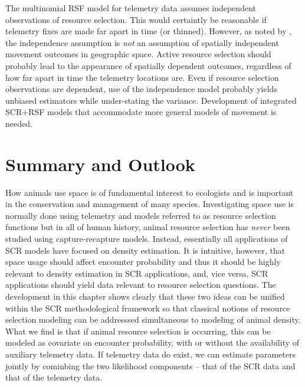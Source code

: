 The multinomial RSF model for telemetry data assumes independent
observations of resource selection.  This would certaintly be
reasonable if telemetry fixes are made far apart in time (or thinned).
However, as noted by \citet{royle_etal:2012mee}, the independence
assumption is {\it not} an assumption of spatially independent
movement outcomes in geographic space.  Active resource selection
should probably lead to the appearance of spatially dependent
outcomes, regardless of how far apart in time the telemetry locations
are.  Even if resource selection observations are dependent, use of
the independence model probably yields unbiased estimators while
under-stating the variance.  Development of integrated SCR+RSF models
that accommodate more general models of movement is needed.




\section{Summary and Outlook}


How animals use space is of fundamental interest to ecologists and is
important in the conservation and management of many
species. Investigating space use is normally done using telemetry and
models referred to as resource selection functions
\citep{manly_etal:2002} but in all of human %
history, animal resource selection has {\it never} been studied using
capture-recapture models. Instead, essentially all applications of SCR
models have focused on density estimation.  It is intuitive, however,
that space usage should affect encounter probability and thus it
should be highly relevant to density estimation in SCR applications,
and, vice versa, SCR applications should yield data relevant to
resource selection questions. The development in this chapter shows
clearly that these two ideas can be unified within the SCR
methodological framework so that classical notions of resource
selection modeling can be addresssed simultaneous to modeling of
animal density. What we find is that if animal resource selection is
occurring, this can be modeled as covariate on encounter probability,
with or without the availability of auxiliary telemetry data. If
telemetry data do exist, we can estimate parameters jointly by
cominbing the two likelihood components -- that of the SCR data and
that of the telemetry data.


